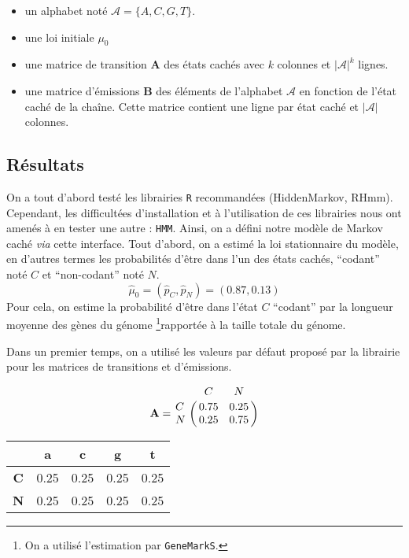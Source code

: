 \documentclass[12pt,a4paper]{article}
\begin{document}
\begin{itemize}
\item un alphabet noté $\mathcal{A} = \{A,C,G,T\}$.
\item une loi initiale $\mu_0$
\item une matrice de transition $\mathbf{A}$ des états cachés avec $k$ colonnes et $|\mathcal{A}|^k$ lignes.
\item  une matrice d'émissions  $\mathbf{B}$ des éléments de l'alphabet $\mathcal{A}$ en fonction de l'état caché de la chaîne. Cette matrice contient une ligne par état caché et $|\mathcal{A}|$ colonnes.
\end{itemize}

\subsection{Résultats}


On a tout d'abord testé les librairies \verb+R+ recommandées (HiddenMarkov, RHmm). 
Cependant, les difficultées d'installation et à l'utilisation de ces librairies nous ont amenés à en tester une autre : \verb+HMM+.
Ainsi, on a défini notre modèle de Markov caché \emph{via} cette interface.
Tout d'abord, on a estimé la  loi stationnaire du modèle,  en d'autres termes les probabilités d'être dans l'un des états cachés, ``codant'' noté $C$ et ``non-codant'' noté $N$.
\[
	\hat{\mu}_0 = (\hat{p}_C,\hat{p}_N) = (0.87,0.13)
\]
Pour cela, on estime la  probabilité d'être dans l'état $C$ ``codant'' par la longueur moyenne des gènes du génome \footnote{On a utilisé l'estimation par \verb+GeneMarkS+.}rapportée à la taille totale du génome.


Dans un premier temps,  on a  utilisé les valeurs par défaut proposé par la librairie pour les matrices de transitions et d'émissions.

\[
	\mathbf{A} = 
\bordermatrix{~ & C & N \cr
                  C & 0.75 & 0.25 \cr
                  N & 0.25 & 0.75 \cr}
\]


\begin{table}[!h]
	\centering
	\begin{tabular}{ccccc}
		& \textbf{a} & \textbf{c} & \textbf{g} & \textbf{t}\\
		\hline
		\textbf{C} & 0.25 & 0.25 & 0.25 & 0.25\\
		\textbf{N} & 0.25 & 0.25 & 0.25 & 0.25\\
		\hline
	\end{tabular}

\end{table}
\end{document}
